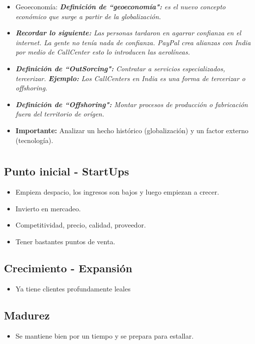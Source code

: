 \begin{itemize}
    \item Geoeconomía: \emph{\textbf{Definición de ``geoeconomía":} es el nuevo concepto económico que surge a partir de la globalización.}
    \item \emph{\textbf{Recordar lo siguiente: }Las personas tardaron en agarrar confianza en el internet. La gente no tenía nada de confianza. PayPal crea alianzas con India por medio de CallCenter esto lo introducen las aerolíneas.}
    \item \emph{\textbf{Definición de ``OutSorcing":} Contratar a servicios especializados, tercerizar. \emph{\textbf{Ejemplo: }Los CallCenters en India es una forma de tercerizar o offshoring.}}
    \item \emph{\textbf{Definición de ``Offshoring":} Montar procesos de producción o fabricación fuera del territorio de orígen.}
    \item \textbf{Importante:} Analizar un hecho histórico (globalización) y un factor externo (tecnología).
\end{itemize}

\section{}
\subsection{Punto inicial - StartUps}
\begin{itemize}
    \item Empieza despacio, los ingresos son bajos y luego empiezan a crecer.
    \item Invierto en mercadeo.
    \item Competitividad, precio, calidad, proveedor. 
    \item Tener bastantes puntos de venta.
\end{itemize}

\subsection{Crecimiento - Expansión}
\begin{itemize}
    \item Ya tiene clientes profundamente leales
\end{itemize}

\subsection{Madurez}
\begin{itemize}
    \item Se mantiene bien por un tiempo y se prepara para estallar.
\end{itemize}

